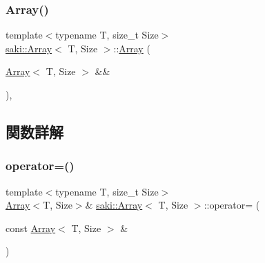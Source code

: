 \mbox{\label{classsaki_1_1_array_a686fcaee74acba32d3b539c9f9583548}} 
\subsubsection{\texorpdfstring{Array()}{Array()}\hspace{0.1cm}{\footnotesize\ttfamily [4/4]}}
{\footnotesize\ttfamily template$<$typename T, size\+\_\+t Size$>$ \\
\mbox{\hyperlink{classsaki_1_1_array}{saki\+::\+Array}}$<$ T, Size $>$\+::\mbox{\hyperlink{classsaki_1_1_array}{Array}} (\begin{DoxyParamCaption}\item[{\mbox{\hyperlink{classsaki_1_1_array}{Array}}$<$ T, Size $>$ \&\&}]{ }\end{DoxyParamCaption})\hspace{0.3cm}{\ttfamily [default]}, {\ttfamily [noexcept]}}



\subsection{関数詳解}
\mbox{\label{classsaki_1_1_array_ab021e652e537713152ca89cc8f2b68c5}} 
\subsubsection{\texorpdfstring{operator=()}{operator=()}\hspace{0.1cm}{\footnotesize\ttfamily [1/2]}}
{\footnotesize\ttfamily template$<$typename T, size\+\_\+t Size$>$ \\
\mbox{\hyperlink{classsaki_1_1_array}{Array}}$<$T, Size$>$\& \mbox{\hyperlink{classsaki_1_1_array}{saki\+::\+Array}}$<$ T, Size $>$\+::operator= (\begin{DoxyParamCaption}\item[{const \mbox{\hyperlink{classsaki_1_1_array}{Array}}$<$ T, Size $>$ \&}]{ }\end{DoxyParamCaption})\hspace{0.3cm}{\ttfamily [default]}}

\mbox{\label{classsaki_1_1_array_ac84bee02284ec576151f067e4de117db}} 
